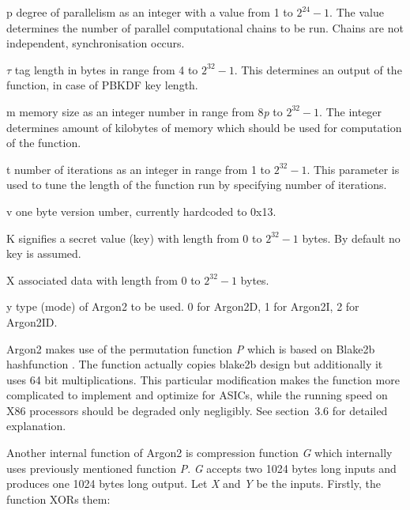 \documentclass[nolof]{fithesis3}
\begin{document}
\begin{description}
\item{p} degree of parallelism as an integer with a value from 1 to \(2^{24} - 1\). The value determines the number of parallel computational chains to be run. Chains are not independent, synchronisation occurs.

\item{\(\tau\)} tag length in bytes in range from 4 to \(2^{32} - 1\). This determines an output of the function, in case of PBKDF key length.

\item{m} memory size as an integer number in range from 8\emph{p} to \(2^{32} - 1\). The integer determines amount of kilobytes of memory which should be used for computation of the function.

\item{t} number of iterations as an integer in range from 1 to \(2^{32} - 1\). This parameter is used to tune the length of the function run by specifying number of iterations.

\item{v} one byte version umber, currently hardcoded to 0x13.

\item{K} signifies a secret value (key) with length from 0 to \(2^{32} - 1\) bytes. By default no key is assumed.

\item{X} associated data with length from 0 to \(2^{32} - 1\) bytes.

\item{y} type (mode) of Argon2 to be used. 0 for Argon2D, 1 for Argon2I, 2 for Argon2ID.
\end{description}

Argon2 makes use of the permutation function \emph{P} which is based on Blake2b hashfunction \parencite{blake2}. The function actually copies blake2b design but additionally it uses 64 bit multiplications. This particular modification makes the function more complicated to implement and optimize for ASICs, while the running speed on X86 processors should be degraded only negligibly. See \parencite{argon2draft}{section~3.6} for detailed explanation.

Another internal function of Argon2 is compression function \emph{G} which internally uses previously mentioned function \emph{P}. \emph{G} accepts two 1024 bytes long inputs and produces one 1024 bytes long output. Let \emph{X} and \emph{Y} be the inputs. Firstly, the function XORs them:
\end{document}
